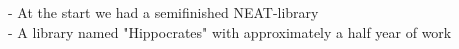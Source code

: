 - At the start we had a semifinished NEAT-library\\
- A library named "Hippocrates" with approximately a half year of work

